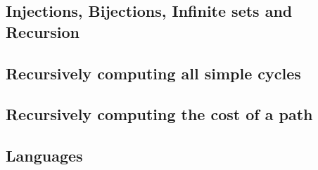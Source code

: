 \documentclass[twocolumn,a4paper]{article}
\newcommand{\image}[2][1.0]{
\begin{figure}[ht]
	\centering
	\fbox{\resizebox{#1\columnwidth}{!}{\texttt{[image: \#2]}}}
\end{figure}
}
\begin{document}
\newpage
\subsection*{Injections, Bijections, Infinite sets and Recursion}
\image{misc/2018-2-2.png}

\newpage
\subsection*{Recursively computing all simple cycles}
\image{misc/vertecies-uppg.png}

\newpage
\subsection*{Recursively computing the cost of a path}
\image[0.95]{misc/5-1.png}

\newpage
\subsection*{Languages}
\image{misc/languages.png}
\end{document}
